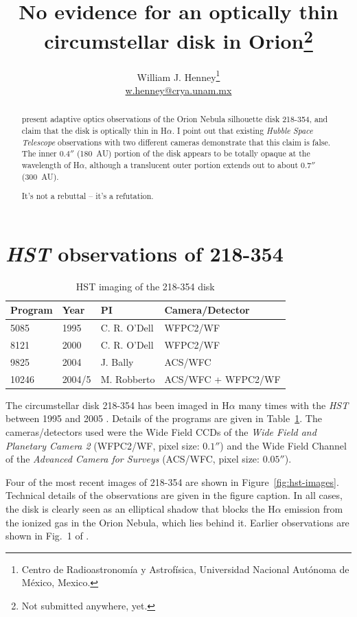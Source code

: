 \documentclass[oneside, 11pt]{article}
\title{No evidence for an optically thin circumstellar disk in Orion\thanks{Not submitted anywhere, yet.}}
\author{William J. Henney\thanks{
    Centro de Radioastronomía y Astrofísica, 
    Universidad Nacional Autónoma de México, Mexico.  
  }\\
  \protect\footnotesize\url{w.henney@crya.unam.mx}
  }
\begin{document}
\maketitle

\begin{abstract}
  \citet{Follette:2013a} present adaptive optics observations of the Orion Nebula silhouette disk 218-354, and claim that the disk is optically thin in H\(\alpha\).  I point out that existing \textit{Hubble Space Telescope} observations with two different cameras demonstrate that this claim is false.  The inner \(0.4''\) (180~AU) portion of the disk appears to be totally opaque at the wavelength of H\(\alpha\), although a translucent outer portion extends out to about \(0.7''\) (300~AU).

  It's not a rebuttal -- it's a refutation. 
\end{abstract}

\clearpage
\section{\textit{HST} observations of 218-354}
\label{sec:hst}


\begin{table}
  \caption{HST imaging of the 218-354 disk}
  \label{tab:hst}
  \centering
  \smallskip
  \begin{tabular}{llll}\toprule
  Program & Year & PI & Camera/Detector \\ \midrule
  5085 & 1995 & C. R. O'Dell & WFPC2/WF \\
  8121 & 2000 & C. R. O'Dell & WFPC2/WF \\
  9825 & 2004 & J. Bally & ACS/WFC \\
  10246 & 2004/5 & M. Robberto & ACS/WFC + WFPC2/WF\\ \bottomrule
\end{tabular}
\end{table}

The circumstellar disk 218-354 has been imaged in H\(\alpha\) many times with the \textit{HST} between 1995 and 2005  \citep{McCaughrean:1996a, ODell:2001c, Bally:2006a, Ricci:2008a, Robberto:2013a}.   Details of the programs are given in Table~\ref{tab:hst}.  The cameras/detectors used were the Wide Field CCDs of the \textit{Wide Field and Planetary Camera 2} (WFPC2/WF, pixel size: \(0.1''\)) and the Wide Field Channel of the \textit{Advanced Camera for Surveys} (ACS/WFC, pixel size: \(0.05''\)).   

Four of the most recent images of 218-354 are shown in Figure~\ref{fig:hst-images}.   Technical details of the observations are given in the figure caption.   In all cases, the disk is clearly seen as an elliptical shadow that blocks the H\(\alpha\) emission from the ionized gas in the Orion Nebula, which lies behind it.   Earlier observations are shown in Fig.~1 of \citet{McCaughrean:1996a}. 
\end{document}
